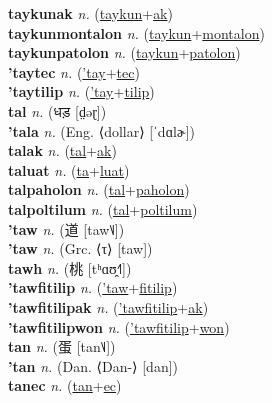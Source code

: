 \textbf{taykunak} \textit{n.} (\hyperref[taykun]{taykun}+\hyperref[ak]{ak})
 \label{taykunak} \\
\textbf{taykunmontalon} \textit{n.} (\hyperref[taykun]{taykun}+\hyperref[montalon]{montalon})
 \label{taykunmontalon} \\
\textbf{taykunpatolon} \textit{n.} (\hyperref[taykun]{taykun}+\hyperref[patolon]{patolon})
 \label{taykunpatolon} \\
\textbf{'taytec} \textit{n.} (\hyperref['tay]{'tay}+\hyperref[tec]{tec})
 \label{'taytec} \\
\textbf{'taytilip} \textit{n.} (\hyperref['tay]{'tay}+\hyperref[tilip]{tilip})
 \label{'taytilip} \\
\textbf{tal} \textit{n.} ({\devanagari{}धड़} [d̤əɽ])
 \label{tal} \\
\textbf{'tala} \textit{n.} (Eng. ⟨dollar⟩ [ˈdɑlɚ])
 \label{'tala} \\
\textbf{talak} \textit{n.} (\hyperref[tal]{tal}+\hyperref[ak]{ak})
 \label{talak} \\
\textbf{taluat} \textit{n.} (\hyperref[ta]{ta}+\hyperref[luat]{luat})
 \label{taluat} \\
\textbf{talpaholon} \textit{n.} (\hyperref[tal]{tal}+\hyperref[paholon]{paholon})
 \label{talpaholon} \\
\textbf{talpoltilum} \textit{n.} (\hyperref[tal]{tal}+\hyperref[poltilum]{poltilum})
 \label{talpoltilum} \\
\textbf{'taw} \textit{n.} ({\chinese{}道} [taw˥˩])
 \label{'taw} \\
\textbf{'taw} \textit{n.} (Grc. ⟨τ⟩ [taw])
 \label{'taw} \\
\textbf{tawh} \textit{n.} ({\chinese{}桃} [tʰɑʊ̯˧˥])
 \label{tawh} \\
\textbf{'tawfitilip} \textit{n.} (\hyperref['taw]{'taw}+\hyperref[fitilip]{fitilip})
 \label{'tawfitilip} \\
\textbf{'tawfitilipak} \textit{n.} (\hyperref['tawfitilip]{'tawfitilip}+\hyperref[ak]{ak})
 \label{'tawfitilipak} \\
\textbf{'tawfitilipwon} \textit{n.} (\hyperref['tawfitilip]{'tawfitilip}+\hyperref[won]{won})
 \label{'tawfitilipwon} \\
\textbf{tan} \textit{n.} ({\chinese{}蛋} [tan˥˩])
 \label{tan} \\
\textbf{'tan} \textit{n.} (Dan. ⟨Dan-⟩ [dan])
 \label{'tan} \\
\textbf{tanec} \textit{n.} (\hyperref[tan]{tan}+\hyperref[ec]{ec})
 \label{tanec} \\
